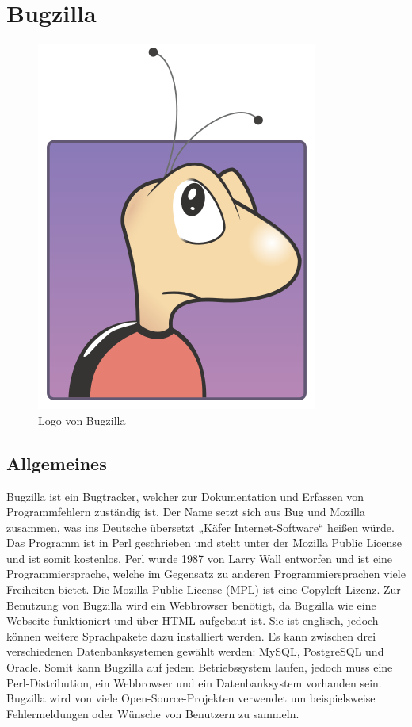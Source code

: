 \section{Bugzilla}
\begin{figure}[h]
  \centering
  \includegraphics[scale=0.2]{buggie.png}
  \caption{Logo von Bugzilla}
  \label{fig:bugzilla}
\end{figure}

\subsection{Allgemeines}
Bugzilla ist ein Bugtracker, welcher zur Dokumentation und Erfassen von Programmfehlern zuständig ist. Der Name setzt sich aus Bug und Mozilla zusammen, was ins Deutsche übersetzt „Käfer Internet-Software“ heißen würde.
Das Programm ist in Perl geschrieben und steht unter der Mozilla Public License und ist somit kostenlos.
Perl wurde 1987 von Larry Wall entworfen und ist eine Programmiersprache, welche im Gegensatz zu anderen Programmiersprachen viele Freiheiten bietet. 
Die Mozilla Public License (MPL) ist eine Copyleft-Lizenz.
Zur Benutzung von Bugzilla wird ein Webbrowser benötigt, da Bugzilla wie eine Webseite funktioniert und über HTML aufgebaut ist. Sie ist englisch, jedoch können weitere Sprachpakete dazu installiert werden. Es kann zwischen drei verschiedenen Datenbanksystemen gewählt werden: MySQL, PostgreSQL und Oracle.
Somit kann Bugzilla auf jedem Betriebssystem laufen, jedoch muss eine Perl-Distribution, ein Webbrowser und ein Datenbanksystem vorhanden sein.
Bugzilla wird von viele Open-Source-Projekten verwendet um beispielsweise Fehlermeldungen oder Wünsche von Benutzern zu sammeln. 

